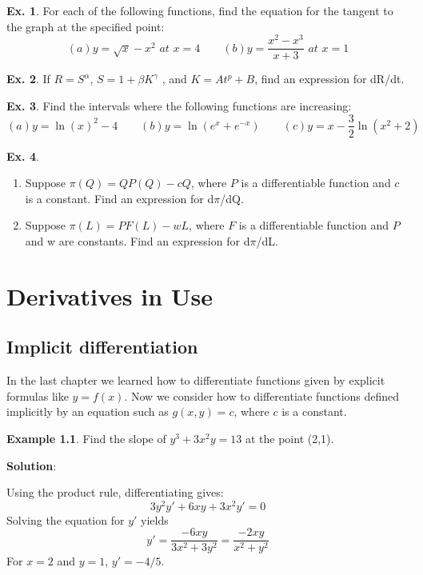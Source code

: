 \documentclass[10pt,a4paper]{book}
\theoremstyle{definition}\newtheorem{definition}{Definition}
\theoremstyle{definition}\newtheorem{fact}{Fact}
\theoremstyle{definition}\newtheorem{ex}{Ex.}
\theoremstyle{definition}\newtheorem{project}{Project}
\theoremstyle{definition}\newtheorem{problem}{Problem}
\theoremstyle{definition}\newtheorem{example}{Example}
\numberwithin{theorem}{chapter}
\numberwithin{corollary}{chapter}
\numberwithin{assumption}{chapter}
\numberwithin{definition}{chapter}
\numberwithin{prop}{chapter}
\numberwithin{notation}{chapter}
\numberwithin{problem}{chapter}
\numberwithin{example}{chapter}
\numberwithin{fact}{chapter}
\numberwithin{ex}{chapter}
\begin{document}
	\begin{ex}
		For each of the following functions, find the equation for the tangent to the graph at the specified point:
		\begin{equation*}
			(a) y=\sqrt{x}-x^2 \,\,at\,\,x=4 \qquad
			(b) y=\frac{x^2-x^3}{x+3} \,\,at\,\,x=1
		\end{equation*}
	\end{ex}
	
	\begin{ex}
		If $R = S^{\alpha}$, $S = 1 + \beta K^{\gamma}$ , and $K = At^p + B$, find an expression for dR/dt.
	\end{ex}
	
	\begin{ex}
		Find the intervals where the following functions are increasing:
		\begin{equation*}
			(a) y=\ln(x)^2-4 \qquad
			(b) y=\ln(e^x+e^{-x}) \qquad
			(c) y=x-\frac{3}{2}\ln(x^2+2)
		\end{equation*}
	\end{ex}
	
	\begin{ex}
		\begin{enumerate}[label=(\alph*)]
			\item Suppose $\pi(Q) = QP(Q) - c Q$, where $P$ is a differentiable function and $c$ is a constant. Find an expression for d$\pi$/dQ.
			\item Suppose $\pi(L) = PF(L) - wL$, where $F$ is a differentiable function and $P$ and w are constants. Find an expression for d$\pi$/dL.
		\end{enumerate}
	\end{ex}
	
	\chapter{Derivatives in Use}
	
	\section{Implicit differentiation}
	
	In the last chapter we learned how to differentiate functions given by explicit formulas like $y = f (x)$. Now we consider how to differentiate functions defined implicitly by an equation such as $g(x, y) = c$, where $c$ is a constant. 
	
	\begin{example}
		Find the slope of $y^3+3x^2y=13$ at the point (2,1).
		
		\textbf{Solution}:
		
		Using the product rule, differentiating gives:
		$$3y^2y'+6xy+3x^2y'=0$$
		Solving the equation for $y'$ yields
		$$y'=\frac{-6xy}{3x^2+3y^2}=\frac{-2xy}{x^2+y^2}$$
		For $x=2$ and $y=1$, $y'=-4/5$.
	\end{example}
	
\end{document}
